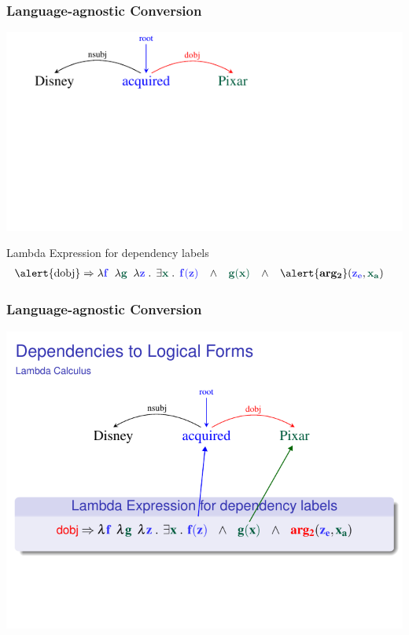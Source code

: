 \documentclass[mathserif,12pt]{beamer}
\newcommand{\hlight}[1]{{\color{blue!80} #1}}
\renewcommand{\land}{\wedge}
\newcommand{\lspace}{.\,}
\begin{document}
\begin{frame}
\frametitle{Language-agnostic Conversion}
\vspace{-2.4em}
\begin{center}
\includegraphics[trim=2em 9.4em 10em 0em,clip=true,scale=1.3]{figures/pixar_dobj}

\end{center}

\vspace{1cm}

\begin{block}{\centering Lambda Expression for dependency labels}
\vspace{-0.5cm}
\begin{align*}
  \hbox{\alert{dobj}} & \Rightarrow  \lambda \hlight{\mathbf{f}}\;\; \lambda {\color{blue!40!green!60!black} \mathbf{g}}\;\; \lambda \hlight{\mathbf{z}}\; \lspace \; \exists {\color{blue!40!green!60!black} \mathbf{x}}\; \lspace \; \hlight{\mathbf{f(z)}}\;\;\; \land \;\;\; {\color{blue!40!green!60!black} \mathbf{g(x)}}  \;\;\; \land\;\;\; \alert{\mathbf{arg_2}}(\hlight{\mathbf{z_e}}, {\color{blue!40!green!60!black} \mathbf{x_a}})
\end{align*}
\vspace{-0.5cm}
\end{block}
\end{frame}

\begin{frame}
\frametitle{Language-agnostic Conversion}
\vspace{2em}
\includegraphics[trim=1em 0em 0em 4em,clip=true,scale=1]{figures/dobj-lambda-calculus}
\end{frame} 
\end{document}
